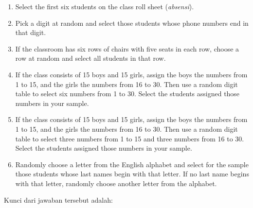 \documentclass[
  letterpaper,
  DIV=11,
  numbers=noendperiod]{scrreprt}
\providecommand{\tightlist}{%
  \setlength{\itemsep}{0pt}\setlength{\parskip}{0pt}}\usepackage{longtable,booktabs,array}
\begin{document}
\begin{enumerate}
\def\labelenumi{\arabic{enumi}.}
\tightlist
\item
  Select the first six students on the class roll sheet
  (\emph{absensi}).
\item
  Pick a digit at random and select those students whose phone numbers
  end in that digit.
\item
  If the classroom has six rows of chairs with five seats in each row,
  choose a row at random and select all students in that row.
\item
  If the class consists of 15 boys and 15 girls, assign the boys the
  numbers from 1 to 15, and the girls the numbers from 16 to 30. Then
  use a random digit table to select six numbers from 1 to 30. Select
  the students assigned those numbers in your sample.
\item
  If the class consists of 15 boys and 15 girls, assign the boys the
  numbers from 1 to 15, and the girls the numbers from 16 to 30. Then
  use a random digit table to select three numbers from 1 to 15 and
  three numbers from 16 to 30. Select the students assigned those
  numbers in your sample.
\item
  Randomly choose a letter from the English alphabet and select for the
  sample those students whose last names begin with that letter. If no
  last name begins with that letter, randomly choose another letter from
  the alphabet.
\end{enumerate}

Kunci dari jawaban tersebut adalah:
\end{document}
